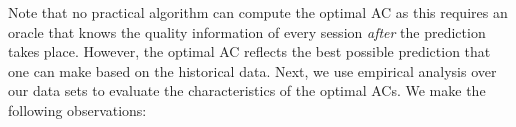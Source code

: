 % 

Note that no practical algorithm can compute the optimal AC as this
requires an oracle that knows the quality information of every session
\emph{after} the prediction takes place. However, the optimal AC
reflects the best possible prediction that one can make based on the
historical data. Next, we use empirical analysis over our data sets to
evaluate the characteristics of the optimal ACs.  We make the following observations:

